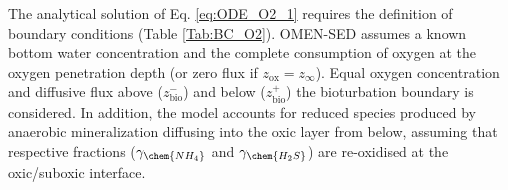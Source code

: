 \documentclass[gmd, manuscript]{copernicus}
\begin{document}
The analytical solution of Eq. \eqref{eq:ODE_O2_1} requires the definition of boundary conditions (Table \ref{Tab:BC_O2}). 
OMEN-SED assumes a known bottom water concentration and the complete consumption of oxygen at the oxygen penetration depth (or zero flux if $z_{\mathrm{ox}}=z_\infty$). 
Equal oxygen concentration and diffusive flux above ($z_{\mathrm{bio}}^-$) and below ($z_{\mathrm{bio}}^+$) the bioturbation boundary is considered. 
In addition, the model accounts for reduced species produced by anaerobic mineralization diffusing into the oxic layer from below, 
assuming that respective fractions ($\gamma_{\chem{NH_4}}$ and $\gamma_{\chem{H_2S}}$) are re-oxidised at the oxic/suboxic interface. 
\end{document}
